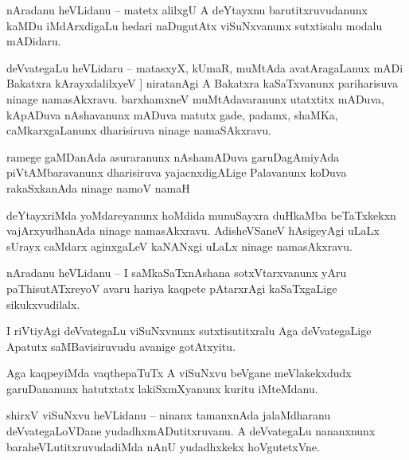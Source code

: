 \documentclass{article}
\begin{document}

\begin{mn}%
nAradanu heVLidanu -- matetx alilxgU A deYtayxnu barutitxruvudanunx kaMDu iMdArxdigaLu hedari 
naDugutAtx viSuNxvanunx sutxtisalu modalu mADidaru.
\end{mn}

\begin{mn}%
deVvategaLu heVLidaru -- matasxyX, kUmaR, muMtAda avatAragaLanux mADi Bakatxra kArayxdalilxyeV ]
niratanAgi A Bakatxra kaSaTxvanunx pariharisuva ninage namasAkxravu. barxhamxneV muMtAdavaranunx 
utatxtitx mADuva, kApADuva nAshavanunx mADuva matutx gade, padamx, shaMKa, caMkarxgaLanunx 
dharisiruva ninage namaSAkxravu.
\end{mn}

\begin{mn}%
ramege gaMDanAda asuraranunx nAshamADuva garuDagAmiyAda piVtAMbaravanunx dharisiruva 
yajacnxdigALige Palavanunx koDuva rakaSxkanAda ninage namoV namaH 
\end{mn}

\begin{mn}%
deYtayxriMda yoMdareyanunx hoMdida munuSayxra duHkaMba beTaTxkekxn vajArxyudhanAda ninage 
namasAkxravu. AdisheVSaneV hAsigeyAgi uLaLx sUrayx caMdarx aginxgaLeV kaNANxgi uLaLx ninage 
namasAkxravu.
\end{mn}

\begin{mn}%
nAradanu heVLidanu -- I saMkaSaTxnAshana sotxVtarxvanunx yAru paThisutATxreyoV avaru hariya kaqpete 
pAtarxrAgi kaSaTxgaLige sikukxvudilalx.
\end{mn}

\begin{mn}%
I riVtiyAgi deVvategaLu viSuNxvnunx sutxtisutitxralu Aga deVvategaLige Apatutx saMBavisiruvudu 
avanige gotAtxyitu.
\end{mn}

\begin{mn}%
Aga kaqpeyiMda vaqthepaTuTx A viSuNxvu beVgane meVlakekxdudx garuDananunx hatutxtatx lakiSxmXyanunx 
kuritu iMteMdanu.
\end{mn}

\begin{mn}%
shirxV viSuNxvu heVLidanu -- ninanx tamanxnAda jalaMdharanu deVvategaLoVDane yudadhxmADutitxruvanu. 
A deVvategaLu nananxnunx baraheVLutitxruvudadiMda nAnU yudadhxkekx hoVgutetxVne.
\end{mn}
\end{document}
